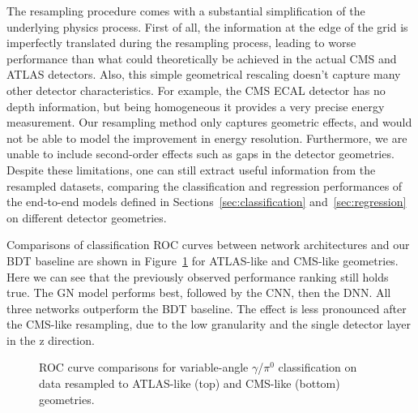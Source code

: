 
The resampling procedure comes with a substantial simplification of the underlying physics process. First of all, the information at the edge of the grid is imperfectly translated during the resampling process, leading to worse performance than what could theoretically be achieved in the actual CMS and ATLAS detectors. Also, this simple geometrical rescaling doesn't capture many other detector characteristics. For example, the CMS ECAL detector has no depth information, but being homogeneous it provides a very precise energy measurement. Our resampling method only captures geometric effects, and would not be able to model the improvement in energy resolution. Furthermore, we are unable to include second-order effects such as gaps in the detector geometries. Despite these limitations, one can still extract useful information from the resampled datasets, comparing the classification and regression performances of the end-to-end models defined in Sections~\ref{sec:classification} and~\ref{sec:regression} on different detector geometries.

Comparisons of classification ROC curves between network architectures and our BDT baseline are shown in Figure~\ref{fig:class_ROC_ATLAS_CMS} for ATLAS-like and CMS-like geometries. Here we can see that the previously observed performance ranking still holds true. The GN
model performs best, followed by the CNN, then the DNN. All three networks outperform the BDT baseline. The effect is less pronounced after the CMS-like resampling, due to the low granularity and the single detector layer in the z direction.

\begin{figure}[htbp]
    \centering
    \caption{ROC curve comparisons for variable-angle $\gamma$/$\pi^0$ classification on data resampled to ATLAS-like (top) and CMS-like (bottom) geometries.}
    \label{fig:class_ROC_ATLAS_CMS}
\end{figure}

